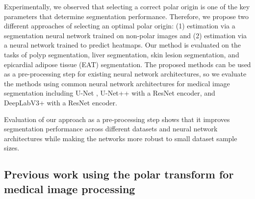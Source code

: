 Experimentally, we observed that selecting
a correct polar origin is one of the key parameters that determine segmentation performance. Therefore, we propose two 
different approaches of selecting an optimal polar origin: (1)
estimation via a segmentation neural network trained on non-polar images and (2) estimation via a neural network trained
to predict heatmaps.
Our method is evaluated on 
the tasks of polyp segmentation, liver segmentation, skin 
lesion segmentation, and epicardial adipose tissue (EAT) segmentation.
The proposed methods can be used as a pre-processing step for 
existing neural network architectures, so we evaluate the methods using
common neural network architectures for medical image segmentation including U-Net 
\cite{ronnebergerUNetConvolutionalNetworks2015}, U-Net++ 
\cite{zhou2019unetplusplus} with a ResNet \cite{heDeepResidualLearning2016} encoder, and DeepLabV3+ \cite{chenEncoderDecoderAtrousSeparable2018} with a ResNet \cite{heDeepResidualLearning2016} encoder.

Evaluation of our approach as a pre-processing step shows that it improves segmentation performance across different datasets and neural network architectures while making the networks more robust to small dataset sample sizes.

    \subsection{Previous work using the polar transform for medical image processing}
    

